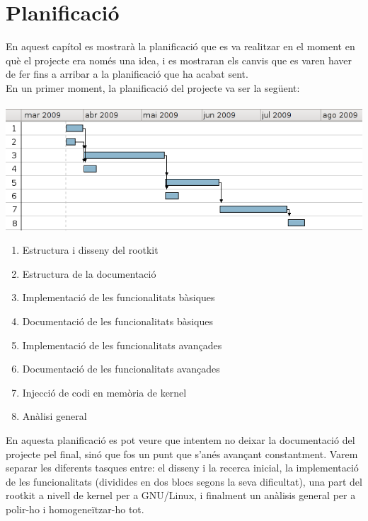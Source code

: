 \chapter{Planificació}

En aquest capítol es mostrarà la planificació que es va realitzar en el moment en què el projecte era
només una idea, i es mostraran els canvis que es varen haver de fer fins a arribar a la planificació que ha 
acabat sent. \\

En un primer moment, la planificació del projecte va ser la següent: \\
\\
\includegraphics[scale=0.75,keepaspectratio]{primer_gantt2.png} 

\begin{enumerate}
    \item Estructura i disseny del rootkit
    \item Estructura de la documentació
    \item Implementació de les funcionalitats bàsiques
    \item Documentació de les funcionalitats bàsiques
    \item Implementació de les funcionalitats avançades 
    \item Documentació de les funcionalitats avançades 
    \item Injecció de codi en memòria de kernel
    \item Anàlisi general
\end{enumerate}

En aquesta planificació es pot veure que intentem no deixar la documentació del projecte pel final, 
sinó que fos un punt que s'anés avançant constantment. Varem separar les diferents tasques entre: el disseny
i la recerca inicial, la implementació de les funcionalitats (dividides en dos blocs segons la seva dificultat),
una part del rootkit a nivell de kernel per a GNU/Linux, i finalment un anàlisis general per a polir-ho
i homogeneïtzar-ho tot. \\

